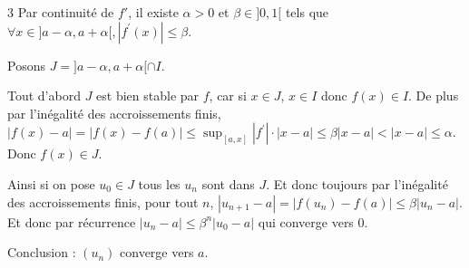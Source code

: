 \begin{correction}{3}
Par continuité de $f'$, il existe $\alpha>0$ et $\beta\in]0,1[$ tels que $\forall x\in]a-\alpha,a+\alpha[, |f^{\prime}(x)|\le\beta$.

Posons $J=]a-\alpha,a+\alpha[\cap I$.

Tout d'abord $J$ est bien stable par $f$, car si $x\in J$, $x\in I$ donc $f(x)\in I$.
De plus par l'inégalité des accroissements finis, $|f(x)-a|=|f(x)-f(a)|\le \sup_{[a,x]}|f^{\prime}|\cdot|x-a|\le\beta|x-a| < |x-a| \le \alpha$. Donc $f(x)\in J$.

Ainsi si on pose $u_{0}\in J$ tous les $u_{n}$ sont dans $J$.
Et donc toujours par l'inégalité des accroissements finis, pour tout $n$, $|u_{n+1}-a|=|f(u_{n})-f(a)|\le\beta|u_{n}-a|$.
Et donc par récurrence $|u_{n}-a|\le\beta^{n}|u_{0}-a|$ qui converge vers 0.

Conclusion : $(u_n)$ converge vers $a$.
\end{correction}

